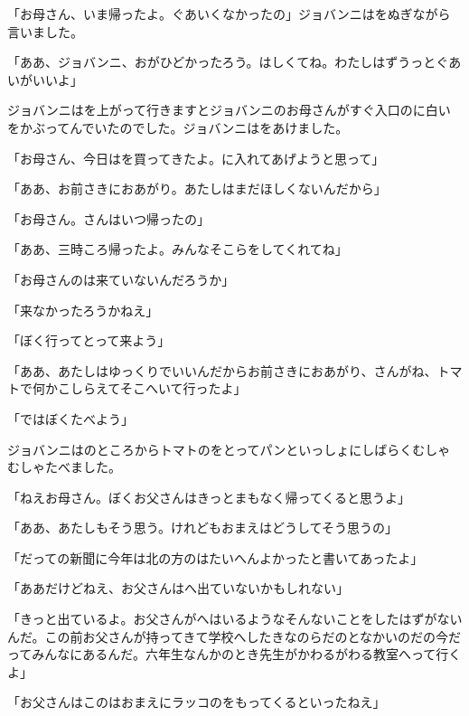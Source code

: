 「お母さん、いま帰ったよ。ぐあいくなかったの」ジョバンニはをぬぎながら言いました。

「ああ、ジョバンニ、おがひどかったろう。はしくてね。わたしはずうっとぐあいがいいよ」

ジョバンニはを上がって行きますとジョバンニのお母さんがすぐ入口のに白いをかぶってんでいたのでした。ジョバンニはをあけました。

「お母さん、今日はを買ってきたよ。に入れてあげようと思って」

「ああ、お前さきにおあがり。あたしはまだほしくないんだから」

「お母さん。さんはいつ帰ったの」

「ああ、三時ころ帰ったよ。みんなそこらをしてくれてね」

「お母さんのは来ていないんだろうか」

「来なかったろうかねえ」

「ぼく行ってとって来よう」

「ああ、あたしはゆっくりでいいんだからお前さきにおあがり、さんがね、トマトで何かこしらえてそこへいて行ったよ」

「ではぼくたべよう」

ジョバンニはのところからトマトのをとってパンといっしょにしばらくむしゃむしゃたべました。

「ねえお母さん。ぼくお父さんはきっとまもなく帰ってくると思うよ」

「ああ、あたしもそう思う。けれどもおまえはどうしてそう思うの」

「だっての新聞に今年は北の方のはたいへんよかったと書いてあったよ」

「ああだけどねえ、お父さんはへ出ていないかもしれない」

「きっと出ているよ。お父さんがへはいるようなそんないことをしたはずがないんだ。この前お父さんが持ってきて学校へしたきなのらだのとなかいのだの今だってみんなにあるんだ。六年生なんかのとき先生がかわるがわる教室へって行くよ」

「お父さんはこのはおまえにラッコのをもってくるといったねえ」

